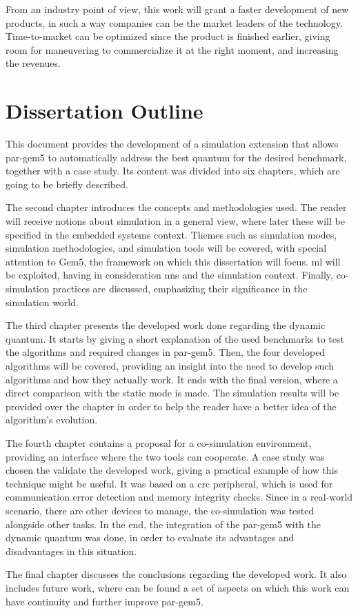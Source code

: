  From an industry point of view, this work will grant a faster development of new products, in such a way companies can be the market leaders 
 of the technology. Time-to-market can be optimized since the product is finished earlier, giving room for maneuvering to commercialize it at the 
 right moment, and increasing the revenues.
 
\section{Dissertation Outline}

This document provides the development of a simulation extension that allows par-gem5 to automatically address the best quantum for the desired 
benchmark, together with a case study. Its content was divided into six chapters, which are going to be briefly described.

The second chapter introduces the concepts and methodologies used. The reader will receive notions about simulation in a general view, where 
later these will be specified in the embedded systems context. Themes such as simulation modes, simulation methodologies, and simulation tools 
will be covered, with special attention to Gem5, the framework on which this dissertation will focus. \gls{ml} will be exploited, having in 
consideration \glspl{nn} and the simulation context. Finally, co-simulation practices are discussed, emphasizing their significance in the 
simulation world.

The third chapter presents the developed work done regarding the dynamic quantum. It starts by giving a short explanation of the used benchmarks
to test the algorithms and required changes in par-gem5. Then, the four developed algorithms will be covered, providing an insight into the need to develop 
such algorithms and how they actually work. It ends with the final version, where a direct comparison with the static mode is made. The 
simulation results will be provided over the chapter in order to help the reader have a better idea of the algorithm's evolution.

The fourth chapter contains a proposal for a co-simulation environment, providing an interface where the two tools can cooperate. 
A case study was chosen the validate the developed work, giving a practical example of how this technique might be useful. 
It was based on a \gls{crc} peripheral, which is used for communication error detection and memory integrity checks. 
Since in a real-world scenario, there are other devices to manage, the co-simulation was tested alongside other tasks. In the end, the integration
of the par-gem5 with the dynamic quantum was done, in order to evaluate its advantages and disadvantages in this situation. 

The final chapter discusses the conclusions regarding the developed work. It also includes future work, where can be found a set of 
aspects on which this work can have continuity and further improve par-gem5. 

